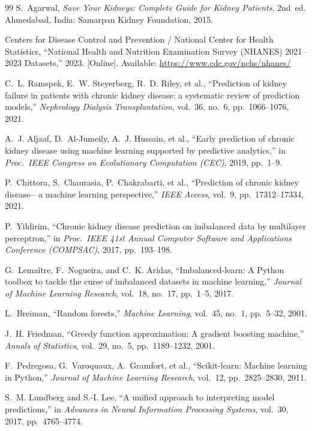 \begin{thebibliography}{99}
S.~Agarwal,
\emph{Save Your Kidneys: Complete Guide for Kidney Patients}, 2nd~ed.
Ahmedabad, India: Samarpan Kidney Foundation, 2015.

Centers for Disease Control and Prevention / National Center for Health
Statistics,
``National Health and Nutrition Examination Survey (NHANES) 2021--2023
Datasets,'' 2023.
[Online]. Available: \url{https://www.cdc.gov/nchs/nhanes/}

C.~L. Ramspek, E.~W. Steyerberg, R.~D. Riley, et al.,
``Prediction of kidney failure in patients with chronic kidney disease: a
systematic review of prediction models,''
\emph{Nephrology Dialysis Transplantation}, vol.~36, no.~6, pp.~1066--1076,
2021.

A.~J. Aljaaf, D.~Al-Jumeily, A.~J. Hussain, et al.,
``Early prediction of chronic kidney disease using machine learning supported by
predictive analytics,''
in \emph{Proc.\ IEEE Congress on Evolutionary Computation (CEC)}, 2019,
pp.~1--9.

P.~Chittora, S.~Chaurasia, P.~Chakrabarti, et al.,
``Prediction of chronic kidney disease---a machine learning perspective,''
\emph{IEEE Access}, vol.~9, pp.~17312--17334, 2021.

P.~Yildirim,
``Chronic kidney disease prediction on imbalanced data by multilayer
perceptron,''
in \emph{Proc.\ IEEE 41st Annual Computer Software and Applications Conference
(COMPSAC)}, 2017, pp.~193--198.

G.~Lema\^{i}tre, F.~Nogueira, and C.~K. Aridas,
``Imbalanced-learn: A Python toolbox to tackle the curse of imbalanced datasets
in machine learning,''
\emph{Journal of Machine Learning Research}, vol.~18, no.~17, pp.~1--5, 2017.

L.~Breiman,
``Random forests,''
\emph{Machine Learning}, vol.~45, no.~1, pp.~5--32, 2001.

J.~H. Friedman,
``Greedy function approximation: A gradient boosting machine,''
\emph{Annals of Statistics}, vol.~29, no.~5, pp.~1189--1232, 2001.

F.~Pedregosa, G.~Varoquaux, A.~Gramfort, et al.,
``Scikit-learn: Machine learning in Python,''
\emph{Journal of Machine Learning Research}, vol.~12, pp.~2825--2830, 2011.

S.~M. Lundberg and S.-I. Lee,
``A unified approach to interpreting model predictions,''
in \emph{Advances in Neural Information Processing Systems}, vol.~30, 2017,
pp.~4765--4774.


\end{thebibliography}
